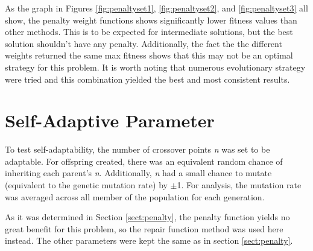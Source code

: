 \documentclass[11pt]{article}
\begin{document}
As the graph in Figures \ref{fig:penaltyset1}, \ref{fig:penaltyset2}, and \ref{fig:penaltyset3} all show, the penalty weight functions shows significantly lower fitness values than other methods. This is to be expected for intermediate solutions, but the best solution shouldn't have any penalty. Additionally, the fact the the different weights returned the same max fitness shows that this may not be an optimal strategy for this problem. It is worth noting that numerous evolutionary strategy were tried and this combination yielded the best and most consistent results.


\newpage
\section{Self-Adaptive Parameter}\label{sect:selfadaptive}

To test self-adaptability, the number of crossover points \textit{n} was set to be adaptable. For offspring created, there was an equivalent random chance of inheriting each parent's \textit{n}. Additionally, \textit{n} had a small chance to mutate (equivalent to the genetic mutation rate) by $\pm$1. For analysis, the mutation rate was averaged across all member of the population for each generation.

As it was determined in Section \ref{sect:penalty}, the penalty function yields no great benefit for this problem, so the repair function method was used here instead. The other parameters were kept the same as in section \ref{sect:penalty}.
\end{document}
